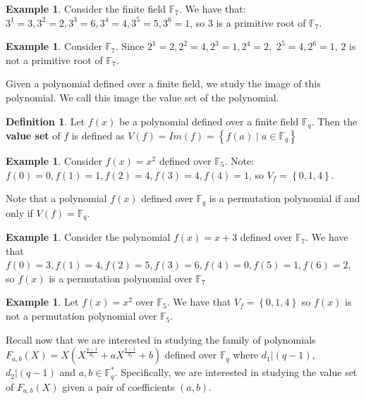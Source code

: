 \documentclass{article}
\theoremstyle{definition}
\newtheorem{definition}[theorem]{Definition}
\newtheorem{example}[theorem]{Example}
\theoremstyle{remark}
\numberwithin{equation}{section}
\begin{document}
\begin{example}
  Consider the finite field $\mathbb{F}_{7}$. We have that: $3^1 = 3, 3^2 = 2, 3^3 = 6, 3^4 = 4, 3^5 = 5, 3^6 = 1$, so $3$ is a primitive root of $\mathbb{F}_{7}$.
\end{example}

\begin{example}
  Consider $\mathbb{F}_{7}$. Since $2^1 = 2, 2^2 = 4, 2^3 = 1, 2^4 = 2,$ $ 2^5 = 4, 2^6 = 1$, $2$ is not a primitive root of $\mathbb{F}_{7}$.
\end{example}

Given a polynomial defined over a finite field, we study the image of this polynomial. We call this image the value set of the polynomial.

\begin{definition}
  Let $f(x)$ be a polynomial defined over a finite field $\mathbb{F}_{q}$. Then the \textbf{value set} of $f$ is defined as $V(f) = Im(f) = \left\{f(a) \mid a \in \mathbb{F}_{q} \right\}$
\end{definition}

\begin{example}
  Consider $f(x) = x^2$ defined over $\mathbb{F}_{5}$. Note: $f(0) = 0, f(1) = 1, f(2) = 4, f(3) = 4, f(4) = 1$, so $V_{f} = \left\{0, 1, 4 \right\}$.
\end{example}

Note that a polynomial $f(x)$ defined over $\mathbb{F}_{q}$ is a permutation polynomial if and only if  $V(f) = \mathbb{F}_{q}$.


\begin{example}
  Consider the polynomial $f(x) = x+3$ defined over $\mathbb{F}_{7}$. We have that $f(0) = 3, f(1) = 4, f(2) = 5, f(3) = 6, f(4) = 0, f(5) = 1, f(6) = 2$, so $f(x)$ is a permutation polynomial over $\mathbb{F}_{7}$
\end{example}

\begin{example}
Let $f(x) = x^2$ over $\mathbb{F}_{5}$. We have that $V_{f} = \left\{0, 1, 4 \right\}$ so $f(x)$ is not a permutation polynomial over $\mathbb{F}_{5}$.
\end{example}

Recall now that we are interested in studying the family of polynomials $F_{a,b}(X) = X(X^{\frac{q-1}{d_1}} + aX^{\frac{q-1}{d_2}} +b)$ defined over $\mathbb{F}_q$ where $d_1 | (q-1)$, $d_2 | (q-1)$ and $a,b \in \mathbb{F}_q^*$. Specifically, we are interested in studying the value set of $F_{a,b}(X)$ given a pair of coefficients $(a,b)$.
\end{document}
